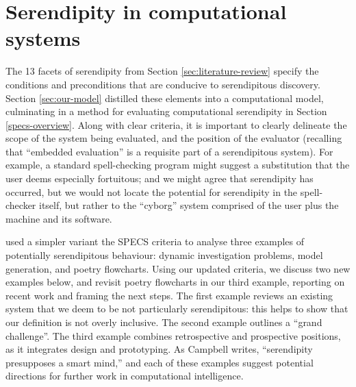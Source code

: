 \section{Serendipity in computational systems} \label{sec:computational-serendipity}

The 13 facets of serendipity from Section \ref{sec:literature-review}
specify the conditions and preconditions that are conducive to
serendipitous discovery.  Section \ref{sec:our-model} distilled these
elements into a computational model, culminating in a method for
evaluating computational serendipity in Section \ref{specs-overview}.
%
Along with clear criteria, it is important to clearly delineate the
scope of the system being evaluated, and the position of the evaluator
(recalling that ``embedded evaluation'' is a requisite part of a
serendipitous system).  For example, a standard spell-checking program
might suggest a substitution that the user deems especially
fortuitous; and we might agree that serendipity has occurred, but we
would not locate the potential for serendipity in the spell-checker
itself, but rather to the ``cyborg'' system comprised of the user plus
the machine and its software.

 used a simpler variant the SPECS criteria
to analyse three examples of potentially serendipitous behaviour:
dynamic investigation problems, model generation, and poetry
flowcharts.  Using our updated criteria, we discuss two new examples
below, and revisit poetry flowcharts in our third example, reporting
on recent work and framing the next steps.  The first example reviews
an existing system that we deem to be not particularly serendipitous:
this helps to show that our definition is not overly inclusive.  The
second example outlines a ``grand challenge''.  The third example
combines retrospective and prospective positions, as it integrates
design and prototyping.  As Campbell
\citeyear{campbell2005serendipity} writes, ``serendipity presupposes a
smart mind,'' and each of these examples suggest potential directions
for further work in computational intelligence.

